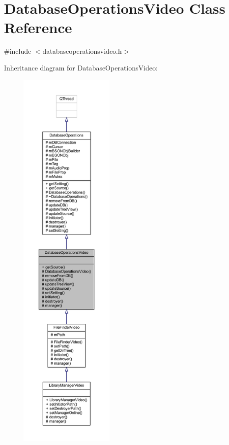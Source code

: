 \hypertarget{class_database_operations_video}{\section{Database\-Operations\-Video Class Reference}
\label{class_database_operations_video}
}


{\ttfamily \#include $<$databaseoperationsvideo.\-h$>$}



Inheritance diagram for Database\-Operations\-Video\-:
\nopagebreak
\begin{figure}[H]
\begin{center}
\leavevmode
\includegraphics[height=550pt]{class_database_operations_video__inherit__graph}
\end{center}
\end{figure}


